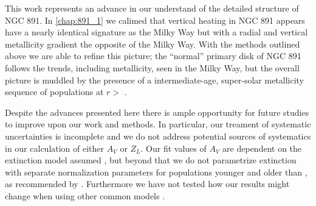 
This work represents an advance in our understand of the detailed
structure of NGC 891. In \ref{chap:891_1} we calimed that
vertical heating in NGC 891 appears have a nearly identical signature
as the Milky Way but with a radial and vertical metallicity gradient
the opposite of the Milky Way. With the methods outlined above we are
able to refine this picture; the ``normal'' primary disk of NGC 891
follows the trends, including metallicity, seen in the Milky Way, but
the overall picture is muddled by the presence of a intermediate-age,
super-solar metallicity sequence of populations at $r >$
. 


Despite the advances presented here there is ample opportunity for
future studies to improve upon our work and methods. In particular,
our treament of systematic uncertainties is incomplete and we do not
address potential sources of systematics in our calculation of either
$A_V$ or $Z_L$. Our fit values of $A_V$ are dependent on the
extinction model assumed \citep[i.e.,][]{Charlot00}, but beyond that
we do not parametrize extinction with separate normalization
parameters for populations younger and older than ,
as recommended by \citet{Charlot00}. Furthermore we have not tested
how our results might change when using other common models
\citep[e.g.,][]{Calzetti94}.

